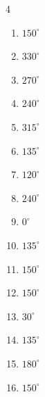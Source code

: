 \begin{multicols}{4}
\begin{enumerate}
\columnbreak %

  \item $\displaystyle 150^{\circ}$

  \item $\displaystyle 330^{\circ}$

  \item $\displaystyle 270^{\circ}$

  \item $\displaystyle 240^{\circ}$

  \item $\displaystyle 315^{\circ}$

  \item $\displaystyle 135^{\circ}$

  \item $\displaystyle 120^{\circ}$

  \item $\displaystyle 240^{\circ}$

  \item $\displaystyle 0^{\circ}$
        \phantom{$\displaystyle =0$}

  \item $\displaystyle 135^{\circ}$

  \item $\displaystyle 150^{\circ}$

  \item $\displaystyle 150^{\circ}$

  \item $\displaystyle 30^{\circ}$

  \item $\displaystyle 135^{\circ}$

  \item $\displaystyle 180^{\circ}$
        \phantom{$\displaystyle =\pi$}

  \item $\displaystyle 150^{\circ}$


\end{enumerate}
\end{multicols}
